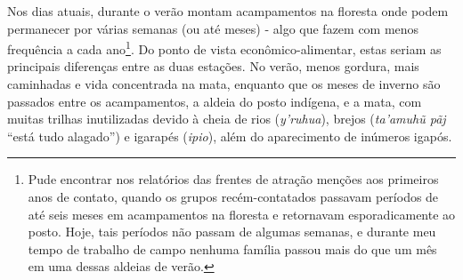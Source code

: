 Nos dias atuais, durante o verão montam acampamentos na floresta onde
podem permanecer por várias semanas (ou até meses) - algo que fazem com
menos frequência a cada ano\footnote{Pude encontrar nos relatórios das
  frentes de atração menções aos primeiros anos de contato, quando os
  grupos recém-contatados passavam períodos de até seis meses em
  acampamentos na floresta e retornavam esporadicamente ao posto. Hoje,
  tais períodos não passam de algumas semanas, e durante meu tempo de
  trabalho de campo nenhuma família passou mais do que um mês em uma
  dessas aldeias de verão.}. Do ponto de vista econômico-alimentar,
estas seriam as principais diferenças entre as duas estações. No verão,
menos gordura, mais caminhadas e vida concentrada na mata, enquanto que
os meses de inverno são passados entre os acampamentos, a aldeia do
posto indígena, e a mata, com muitas trilhas inutilizadas devido à cheia
de rios (\emph{y'ruhua}), brejos (\emph{ta'amuhũ pãj} ``está tudo
alagado'') e igarapés (\emph{ipio}), além do aparecimento de inúmeros
igapós.

